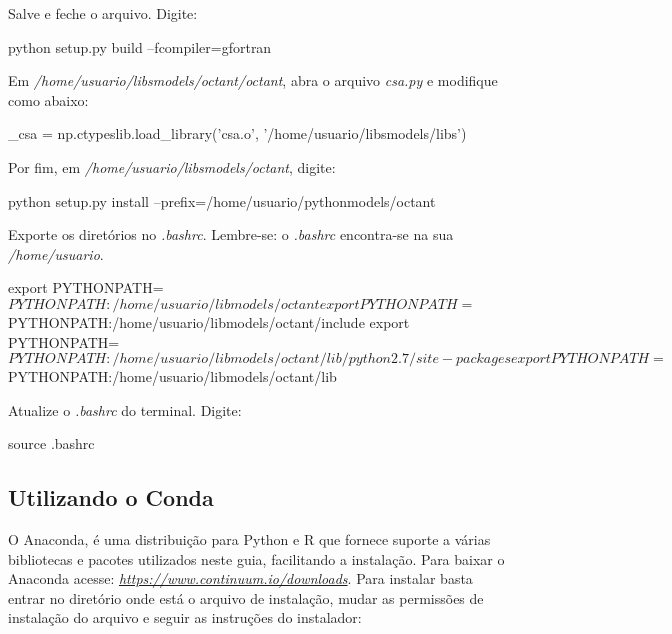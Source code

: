 \noindent Salve e feche o arquivo. Digite:
\bigskip

\begin{bashcode}
python setup.py build --fcompiler=gfortran
\end{bashcode}
\bigskip

\noindent Em \textit{/home/usuario/libsmodels/octant/octant}, abra o arquivo \textit{csa.py} e modifique como abaixo:
\bigskip

\begin{bashcode}
_csa = np.ctypeslib.load_library('csa.o', '/home/usuario/libsmodels/libs')
\end{bashcode}
\bigskip

\noindent Por fim, em \textit{/home/usuario/libsmodels/octant}, digite:
\bigskip

\begin{bashcode}
python setup.py install --prefix=/home/usuario/pythonmodels/octant
\end{bashcode}
\bigskip

\noindent Exporte os diretórios no \textit{.bashrc}. Lembre-se: o \textit{.bashrc} encontra-se na sua \textit{/home/usuario}.
\bigskip

\begin{bashcode}[fontsize=\scriptsize]
export PYTHONPATH=$PYTHONPATH:/home/usuario/libmodels/octant
export PYTHONPATH=$PYTHONPATH:/home/usuario/libmodels/octant/include
export PYTHONPATH=$PYTHONPATH:/home/usuario/libmodels/octant/lib/python2.7/site-packages
export PYTHONPATH=$PYTHONPATH:/home/usuario/libmodels/octant/lib
\end{bashcode}
\bigskip

\noindent Atualize o \textit{.bashrc} do terminal. Digite:
\bigskip

\begin{bashcode}
source .bashrc
\end{bashcode}
\bigskip

\subsection{Utilizando o Conda}\label{condasec}
\bigskip
\noindent O Anaconda, é uma distribuição para Python e R que fornece suporte a várias bibliotecas e pacotes utilizados neste guia, facilitando a instalação. Para baixar o Anaconda acesse: \textcolor{bleu_cite}{\href{https://www.continuum.io/downloads}{\textit{https://www.continuum.io/downloads}}}. Para instalar basta entrar no diretório onde está o arquivo de instalação, mudar as permissões de instalação do arquivo e seguir as instruções do instalador:
\bigskip

